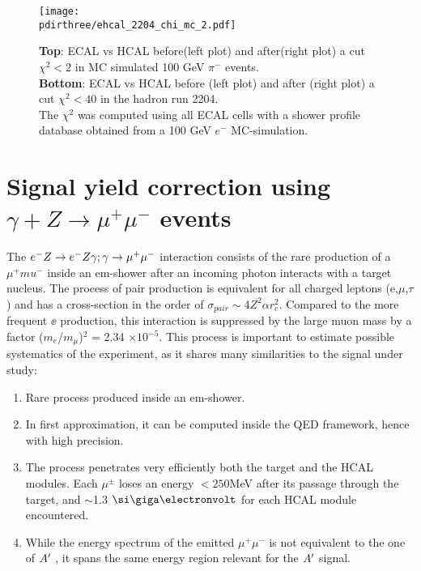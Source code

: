 \begin{figure}[h!]
  \begin{center}
    \texttt{[image: \\pdirthree/ehcal\_2204\_chi\_mc\_2.pdf]}
  \end{center}
  \caption{\textbf{Top}: ECAL vs HCAL before(left plot) and
    after(right plot) a cut
    $\chi^2<2$ in MC simulated 100 GeV $\pi^-$ events. \\
    \textbf{Bottom}: ECAL vs HCAL before (left plot) and after (right
    plot) a cut
    $\chi^2<40$ in the hadron run 2204.\\
    The $\chi^2$ was computed using all ECAL cells with a shower
    profile database obtained from a 100 GeV $e^-$ MC-simulation. }
  \label{fig:ehcal_hadr}
\end{figure}
\fi

\section{Signal yield correction using $\gamma + Z \rightarrow \mu^+ \mu^-$ events }
\label{ch3:sec:dimuons}

The $e^- Z \to e^- Z \gamma; \gamma \to \mu^+ \mu^-$ interaction consists of the rare production of a $\mu^+mu^-$ inside an em-shower after an incoming photon interacts with a target nucleus. The process of pair production is equivalent for all charged leptons (e,$\mu$,$\tau$) and has a cross-section in the order of $\sigma_{pair} \sim 4Z^2\alpha r^2_c$. Compared to the more frequent $\ee$ production, this interaction is suppressed by the large muon mass by a factor ($m_e$/$m_{\mu}$)$^2$ = 2.34 $\times 10^{-5}$. This process is important to estimate possible systematics of the experiment, as it shares many similarities to the signal under study:

\begin{enumerate}
\item Rare process produced inside an em-shower.
\item In first approximation, it can be computed inside the QED framework, hence with high precision.
\item The process penetrates very efficiently both the target and the HCAL modules. Each $\mu^{\pm}$ loses an energy $<250$\si{\mega\electronvolt} after its passage through the target, and $\sim$1.3 $\gev$ for each HCAL module encountered. 
\item While the energy spectrum of the emitted $\mu^+\mu^-$ is not equivalent to the one of $A'$ \cite{dimuon-mc}, it spans the same energy region relevant for the $A'$ signal.
\end{enumerate}

